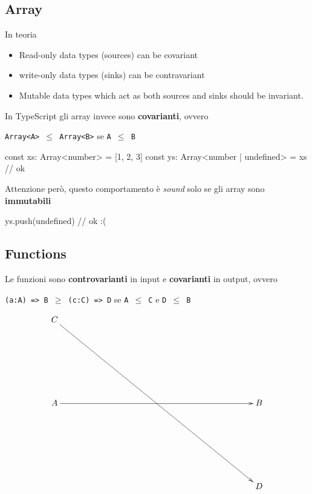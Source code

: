 \documentclass[12pt]{article}
\theoremstyle{definition}
\newenvironment{code}
  {\vspace{0.5cm} \VerbatimEnvironment\begin{typescriptcode}}
  {\end{typescriptcode} \vspace{0.2cm}}
\begin{document}
\subsection{Array}

In teoria

\begin{itemize}
  \item Read-only data types (sources) can be covariant
  \item write-only data types (sinks) can be contravariant
  \item Mutable data types which act as both sources and sinks should be invariant.
\end{itemize}

In TypeScript gli array invece sono \textbf{covarianti}, ovvero

\texttt{Array<A> $\leq$ Array<B>} se \texttt{A $\leq$ B}

\begin{code}
const xs: Array<number> = [1, 2, 3]
const ys: Array<number | undefined> = xs // ok
\end{code}

Attenzione però, questo comportamento è \emph{sound} solo se gli array sono \textbf{immutabili}

\begin{code}
ys.push(undefined) // ok :(
\end{code}

\subsection{Functions}

Le funzioni sono \textbf{controvarianti} in input e \textbf{covarianti} in output, ovvero

\texttt{(a:A) => B $\geq$ (c:C) => D} se \texttt{A $\leq$ C} e \texttt{D $\leq$ B}

\[
\xymatrixrowsep{3cm}
\xymatrixcolsep{8cm}
\xymatrix{
  C \ar[rdd] \\
  A \ar[r] & B \\
    & D \\
}
\]
\end{document}
